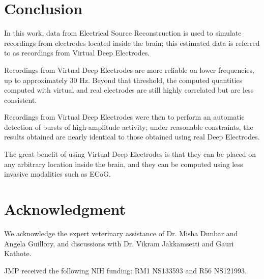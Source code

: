 \documentclass[draftcls, onecolumn, peerreview]{IEEEtran}
\begin{document}

\section{Conclusion}

In this work, data from Electrical Source Reconstruction is used to simulate recordings from electrodes located inside the brain; this estimated data is referred to as recordings from Virtual Deep Electrodes.

Recordings from Virtual Deep Electrodes are more reliable on lower frequencies, up to approximately 30 Hz. Beyond that threshold, the computed quantities computed with virtual and real electrodes are still highly correlated but are less consistent.

Recordings from Virtual Deep Electrodes were then to perform an automatic detection of bursts of high-amplitude activity; under reasonable constraints, the results obtained are nearly identical to those obtained using real Deep Electrodes.

The great benefit of using Virtual Deep Electrodes is that they can be placed on any arbitrary location inside the brain, and they can be computed using less invasive modalities such as ECoG.



\section*{Acknowledgment}

We acknowledge the expert veterinary assistance of Dr. Misha Dunbar and Angela Guillory, and discussions with Dr. Vikram Jakkamsetti and Gauri Kathote.

JMP received the following NIH funding: RM1 NS133593 and R56 NS121993.




\end{document}
